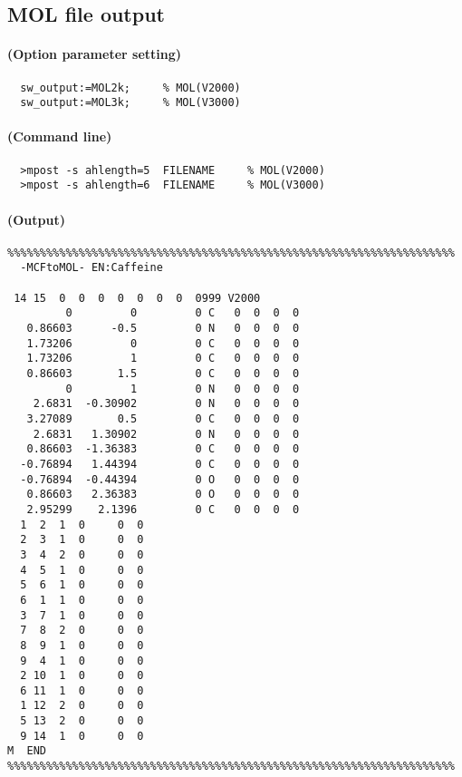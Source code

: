 \documentclass[a4paper]{article}
\begin{document}
\subsection{MOL file output}
\paragraph{(Option parameter setting)}
%
%
%
\begin{verbatim}
  sw_output:=MOL2k;     % MOL(V2000)
  sw_output:=MOL3k;     % MOL(V3000)
\end{verbatim}
\paragraph{(Command line)}
\begin{verbatim}
  >mpost -s ahlength=5  FILENAME     % MOL(V2000)
  >mpost -s ahlength=6  FILENAME     % MOL(V3000)
\end{verbatim}
\paragraph{(Output)}
\begin{verbatim}
%%%%%%%%%%%%%%%%%%%%%%%%%%%%%%%%%%%%%%%%%%%%%%%%%%%%%%%%%%%%%%%%%%%%%
  -MCFtoMOL- EN:Caffeine         

 14 15  0  0  0  0  0  0  0  0999 V2000
         0         0         0 C   0  0  0  0
   0.86603      -0.5         0 N   0  0  0  0
   1.73206         0         0 C   0  0  0  0
   1.73206         1         0 C   0  0  0  0
   0.86603       1.5         0 C   0  0  0  0
         0         1         0 N   0  0  0  0
    2.6831  -0.30902         0 N   0  0  0  0
   3.27089       0.5         0 C   0  0  0  0
    2.6831   1.30902         0 N   0  0  0  0
   0.86603  -1.36383         0 C   0  0  0  0
  -0.76894   1.44394         0 C   0  0  0  0
  -0.76894  -0.44394         0 O   0  0  0  0
   0.86603   2.36383         0 O   0  0  0  0
   2.95299    2.1396         0 C   0  0  0  0
  1  2  1  0     0  0
  2  3  1  0     0  0
  3  4  2  0     0  0
  4  5  1  0     0  0
  5  6  1  0     0  0
  6  1  1  0     0  0
  3  7  1  0     0  0
  7  8  2  0     0  0
  8  9  1  0     0  0
  9  4  1  0     0  0
  2 10  1  0     0  0
  6 11  1  0     0  0
  1 12  2  0     0  0
  5 13  2  0     0  0
  9 14  1  0     0  0
M  END
%%%%%%%%%%%%%%%%%%%%%%%%%%%%%%%%%%%%%%%%%%%%%%%%%%%%%%%%%%%%%%%%%%%%%
\end{verbatim}
\newpage
\end{document}
